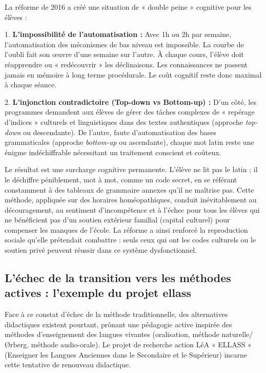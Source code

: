La réforme de 2016 a créé une situation de « double peine » cognitive pour les élèves :

1. \textbf{L'impossibilité de l'automatisation :} Avec 1h ou 2h par semaine, l'automatisation des
mécanismes de bas niveau est impossible. La courbe de l'oubli fait son œuvre d'une semaine sur
l'autre. À chaque cours, l'élève doit réapprendre ou « redécouvrir » les déclinaisons. Les
connaissances ne passent jamais en mémoire à long terme procédurale. Le coût cognitif reste donc
maximal à chaque séance.

2. \textbf{L'injonction contradictoire (Top-down vs Bottom-up) :} D'un côté, les programmes
demandent aux élèves de gérer des tâches complexes de « repérage d'indices » culturels et
linguistiques dans des textes authentiques (approche \textit{top-down} ou descendante). De l'autre,
faute d'automatisation des bases grammaticales (approche \textit{bottom-up} ou ascendante), chaque
mot latin reste une énigme indéchiffrable nécessitant un traitement conscient et coûteux.

Le résultat est une surcharge cognitive permanente. L'élève ne lit pas le latin ; il le déchiffre
péniblement, mot à mot, comme un code secret, en se référant constamment à des tableaux de grammaire
annexes qu'il ne maîtrise pas. Cette méthode, appliquée sur des horaires homéopathiques, conduit
inévitablement au découragement, au sentiment d'incompétence et à l'échec pour tous les élèves qui
ne bénéficient pas d'un soutien extérieur familial (capital culturel) pour compenser les manques de
l'école. La réforme a ainsi renforcé la reproduction sociale qu'elle prétendait combattre : seuls
ceux qui ont les codes culturels ou le soutien privé peuvent réussir dans ce système dysfonctionnel.



\subsection{L'échec de la transition vers les méthodes actives : l'exemple du projet ellass}

Face à ce constat d'échec de la méthode traditionnelle, des alternatives didactiques existent
pourtant, prônant une pédagogie active inspirée des méthodes d'enseignement des langues vivantes
(oralisation, méthode naturelle/Ørberg, méthode audio-orale). Le projet de recherche action LéA «
ELLASS » (Enseigner les Langues Anciennes dans le Secondaire et le Supérieur) incarne cette
tentative de renouveau didactique.\cite{I-3-2-ref32}



